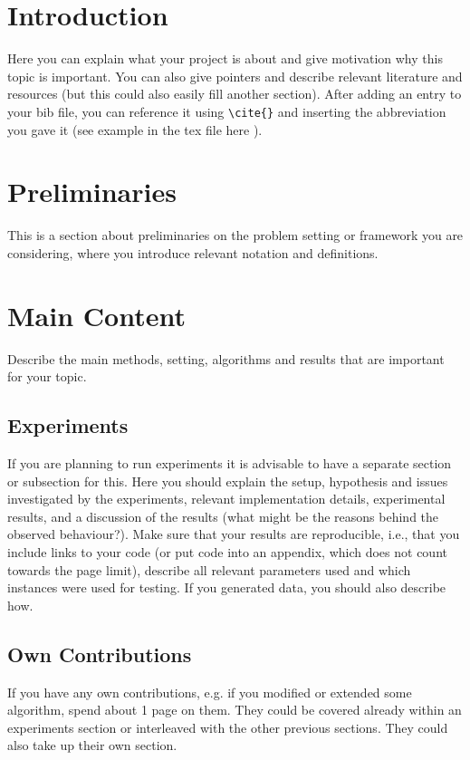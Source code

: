 \documentclass[a4paper,11pt]{article}
\theoremstyle{definition}
\begin{document}
\newpage
\pagestyle{plain}


\section{Introduction}
Here you can explain what your project is about and give motivation why this topic is important. You can also give pointers and describe relevant literature and resources (but this could also easily fill another section). After adding an entry to your bib file, you can reference it using \verb|\cite{}| and inserting the abbreviation you gave it (see example in the tex file here \cite{sample_reference}). 

\section{Preliminaries}
This is a section about preliminaries on the problem setting or framework you are considering, where you  introduce relevant notation and definitions.

\section{Main Content}
Describe the main methods, setting, algorithms and results that are important for your topic.

\subsection{Experiments}
If you are planning to run experiments it is advisable to have a separate section or subsection for this. Here you should explain the setup, hypothesis and issues investigated by the experiments, relevant implementation details, experimental results, and a discussion of the results (what might be the reasons behind the observed behaviour?). Make sure that your results are reproducible, i.e., that you include links to your code (or put code into an appendix, which does not count towards the page limit), describe all relevant parameters used and which instances were used for testing. If you generated data, you should also describe how.

\subsection{Own Contributions}
If you have any own contributions, e.g. if you modified or extended some algorithm, spend about 1 page on them. They could be covered already within an experiments section or interleaved with the other previous sections. They could also take up their own section.
\end{document}
